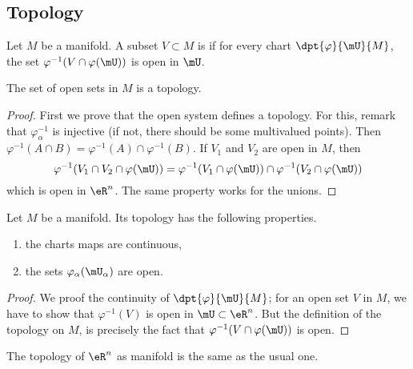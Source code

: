 \subsection{Topology}

\begin{propositionDef}      \label{DEFooHGNOooNqGmxE}
    Let \( M\) be a manifold. A subset $V\subset M$ is  if for every chart $\dpt{\varphi}{\mU}{M}$, the set $\varphi^{-1}(V\cap\varphi(\mU))$ is open in $\mU$. 

    The set of open sets in \( M\) is a topology.
\end{propositionDef}

\begin{proof}
    First we prove that the open system defines a topology. For this, remark that $\varphi_{\alpha}^{-1}$ is injective (if not, there should be some multivalued points). Then $\varphi^{-1}(A\cap B)=\varphi^{-1}(A)\cap\varphi^{-1}(B)$. If $V_1$ and $V_2$ are open in $M$, then
    \begin{equation}
        \varphi^{-1}(V_1\cap V_2\cap\varphi(\mU))=\varphi^{-1}(V_1\cap\varphi(\mU))\cap\varphi^{-1}(V_2\cap\varphi(\mU))
    \end{equation}
    which is open in $\eR^n$. The same property works for the unions.
\end{proof}

\begin{theorem}
    Let \( M\) be a manifold. Its topology has the following properties.
    \begin{enumerate}
        \item the charts maps are continuous,
        \item the sets $\varphi_{\alpha}(\mU_{\alpha})$ are open.
    \end{enumerate}
\end{theorem}

\begin{proof}
    We proof the continuity of $\dpt{\varphi}{\mU}{M}$; for an open set $V$ in $M$, we have to show that $\varphi^{-1}(V)$ is open in $\mU\subset\eR^n$. But the definition of the topology on $M$, is precisely the fact that $\varphi^{-1}(V\cap\varphi(\mU))$ is open.
\end{proof}

\begin{lemma}       \label{LEMooGDMZooLCtnuA}
    The topology of \( \eR^n\) as manifold is the same as the usual one.
\end{lemma}

